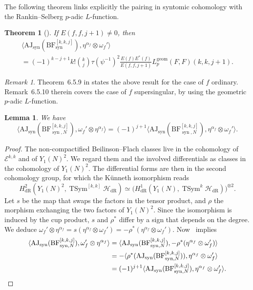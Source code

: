\documentclass[11pt, a4paper, reqno]{amsart}
\theoremstyle{definition}
\theoremstyle{plain}
\newtheorem{theorem}[definition]{Theorem}
\newtheorem{lemma}[definition]{Lemma}
\theoremstyle{remark}
\newtheorem*{remark}{Remark}
\DeclareMathOperator{\TSym}{TSym}
\DeclareMathOperator{\syn}{syn}
\DeclareMathOperator{\dR}{dR}
\newcommand{\HS}{\mathscr{H}}
\newcommand{\Ell}{\mathcal{E}}
\newcommand{\BF}{\mathrm{BF}}
\newcommand{\AJ}{\mathrm{AJ}}
\newcommand{\Lgeom}{L_p^{\mathrm{geom}}}
\begin{document}
The following theorem links explicitly the pairing in syntomic cohomology with the Rankin--Selberg $p$-adic $L$-function.
\begin{theorem}[{\cite[Theorem~6.5.9 and Remark~6.5.10]{KLZ20}}]
    \label{thm:klz-regulator-formula}
    If $E(f,f,j+1)\neq 0$, then
    \begin{multline*}
        \langle \AJ_{\syn}(\BF^{[k,k,j]}_{\syn}),\eta^{\alpha_f}\otimes \omega_f'\rangle \\
        = (-1)^{k-j+1}k!\binom{k}{j}\tau(\psi^{-1})^2\frac{E(f)E^*(f)}{E(f,f,j+1)}\Lgeom(F,F)(k,k,j+1).
    \end{multline*}
\end{theorem}
\begin{remark}
    Theorem~6.5.9 in \cite{KLZ20} states the above result for the case of $f$ ordinary. Remark~6.5.10 therein covers the case of $f$ supersingular, by using the geometric $p$-adic $L$-function.
\end{remark}

\begin{lemma}
    We have
    \[
        \langle \AJ_{\syn}(\BF^{[k,k,j]}_{\syn,N}),\omega_f'\otimes\eta^{\alpha_f}\rangle = (-1)^{j+1} \langle \AJ_{\syn}(\BF^{[k,k,j]}_{\syn,N}),\eta^{\alpha_f}\otimes \omega_f'\rangle.
    \]
\end{lemma}
  \begin{proof}
   The non-compactified Beilinson--Flach classes live in the cohomology of $\Ell^{k, k}$ and of $Y_1(N)^2$. We regard them and the involved differentials as classes in the cohomology of $Y_1(N)^2$. The differential forms are then in the second cohomology group, for which the Künneth isomorphism reads
   \[
    H^2_{\dR}(Y_1(N)^2,\TSym^{[k,k]} \HS_{\dR}) \simeq \bigl(H^1_{\dR}(Y_1(N),\TSym^k \HS_{\dR})\bigr)^{\otimes 2}.
   \]
   Let $s$ be the map that swaps the factors in the tensor product, and $\rho$ the morphism exchanging the two factors of $Y_1(N)^2$. Since the isomorphism is induced by the cup product, $s$ and $\rho^*$ differ by a sign that depends on the degree. We deduce $\omega_f'\otimes\eta^{\alpha_f} = s(\eta^{\alpha_f}\otimes\omega_f') = -\rho^*(\eta^{\alpha_f}\otimes\omega_f')$. Now~\cite[Proposition~5.2.3]{KLZ17} implies
   \begin{align*}
    \langle \AJ_{\syn}(\BF^{[k,k,j]}_{\syn,N}), \omega_f'\otimes\eta^{\alpha_f} \rangle &= \langle \AJ_{\syn}(\BF^{[k,k,j]}_{\syn,N}), -\rho^*(\eta^{\alpha_f}\otimes\omega_f') \rangle \\
    &= -\langle \rho^*(\AJ_{\syn}(\BF^{[k,k,j]}_{\syn,N})), \eta^{\alpha_f}\otimes\omega_f' \rangle \\
    &= (-1)^{j+1} \langle \AJ_{\syn}(\BF^{[k,k,j]}_{\syn,N}), \eta^{\alpha_f}\otimes \omega_f' \rangle.\qedhere
   \end{align*}
  \end{proof}
\end{document}

